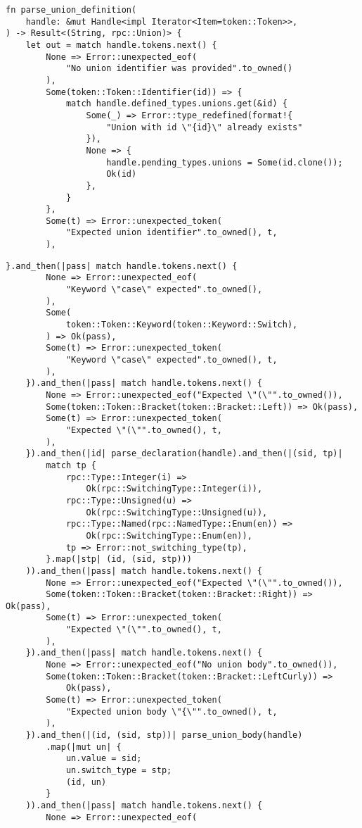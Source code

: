 \begin{lstlisting}[caption={Разбор объединения (часть 1)}, label={lst:rust_parser_union1}]
fn parse_union_definition(
    handle: &mut Handle<impl Iterator<Item=token::Token>>,
) -> Result<(String, rpc::Union)> {
    let out = match handle.tokens.next() {
        None => Error::unexpected_eof(
            "No union identifier was provided".to_owned()
        ),
        Some(token::Token::Identifier(id)) => {
            match handle.defined_types.unions.get(&id) {
                Some(_) => Error::type_redefined(format!{
                    "Union with id \"{id}\" already exists"
                }),
                None => {
                    handle.pending_types.unions = Some(id.clone());
                    Ok(id)
                },
            }
        },
        Some(t) => Error::unexpected_token(
            "Expected union identifier".to_owned(), t,
        ),
\end{lstlisting}
\clearpage
\begin{lstlisting}[caption={Разбор объединения (часть 2)}, label={lst:rust_parser_union2}]
    }.and_then(|pass| match handle.tokens.next() {
        None => Error::unexpected_eof(
            "Keyword \"case\" expected".to_owned(),
        ),
        Some(
            token::Token::Keyword(token::Keyword::Switch),
        ) => Ok(pass),
        Some(t) => Error::unexpected_token(
            "Keyword \"case\" expected".to_owned(), t,
        ),
    }).and_then(|pass| match handle.tokens.next() {
        None => Error::unexpected_eof("Expected \"(\"".to_owned()),
        Some(token::Token::Bracket(token::Bracket::Left)) => Ok(pass),
        Some(t) => Error::unexpected_token(
            "Expected \"(\"".to_owned(), t,
        ),
    }).and_then(|id| parse_declaration(handle).and_then(|(sid, tp)|
        match tp {
            rpc::Type::Integer(i) =>
                Ok(rpc::SwitchingType::Integer(i)),
            rpc::Type::Unsigned(u) =>
                Ok(rpc::SwitchingType::Unsigned(u)),
            rpc::Type::Named(rpc::NamedType::Enum(en)) =>
                Ok(rpc::SwitchingType::Enum(en)),
            tp => Error::not_switching_type(tp),
        }.map(|stp| (id, (sid, stp)))
    )).and_then(|pass| match handle.tokens.next() {
        None => Error::unexpected_eof("Expected \"(\"".to_owned()),
        Some(token::Token::Bracket(token::Bracket::Right)) => Ok(pass),
        Some(t) => Error::unexpected_token(
            "Expected \"(\"".to_owned(), t,
        ),
    }).and_then(|pass| match handle.tokens.next() {
        None => Error::unexpected_eof("No union body".to_owned()),
        Some(token::Token::Bracket(token::Bracket::LeftCurly)) =>
            Ok(pass),
        Some(t) => Error::unexpected_token(
            "Expected union body \"{\"".to_owned(), t,
        ),
    }).and_then(|(id, (sid, stp))| parse_union_body(handle)
        .map(|mut un| {
            un.value = sid;
            un.switch_type = stp;
            (id, un)
        }
    )).and_then(|pass| match handle.tokens.next() {
        None => Error::unexpected_eof(
\end{lstlisting}
